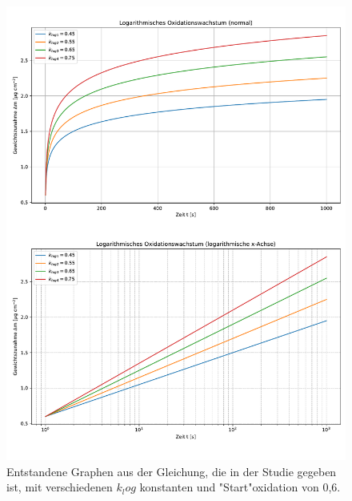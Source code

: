 \begin{figure}
    \includegraphics[width=\textwidth, page=1]{img/21/Plots_oxi.pdf}
    \caption{Entstandene Graphen aus der Gleichung, die in der Studie gegeben ist, mit verschiedenen $k_log$ konstanten und "Start"oxidation von 0,6.}
    \label{fig:log_3}
\end{figure}
\twocolumn